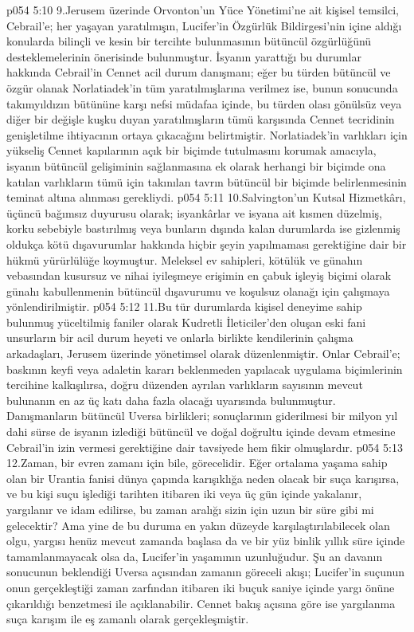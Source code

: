 \vs p054 5:10 9.\bibnobreakspace Jerusem üzerinde Orvonton’un Yüce Yönetimi’ne ait kişisel temsilci, Cebrail’e; her yaşayan yaratılmışın, Lucifer’in Özgürlük Bildirgesi’nin içine aldığı konularda bilinçli ve kesin bir tercihte bulunmasının bütüncül özgürlüğünü desteklemelerinin önerisinde bulunmuştur. İsyanın yarattığı bu durumlar hakkında Cebrail’in Cennet acil durum danışmanı; eğer bu türden bütüncül ve özgür olanak Norlatiadek’in tüm yaratılmışlarına verilmez ise, bunun sonucunda takımyıldızın bütününe karşı nefsi müdafaa içinde, bu türden olası gönülsüz veya diğer bir değişle kuşku duyan yaratılmışların tümü karşısında Cennet tecridinin genişletilme ihtiyacının ortaya çıkacağını belirtmiştir. Norlatiadek’in varlıkları için yükseliş Cennet kapılarının açık bir biçimde tutulmasını korumak amacıyla, isyanın bütüncül gelişiminin sağlanmasına ek olarak herhangi bir biçimde ona katılan varlıkların tümü için takınılan tavrın bütüncül bir biçimde belirlenmesinin teminat altına alınması gerekliydi.
\vs p054 5:11 10.\bibnobreakspace Salvington’un Kutsal Hizmetkârı, üçüncü bağımsız duyurusu olarak; isyankârlar ve isyana ait kısmen düzelmiş, korku sebebiyle bastırılmış veya bunların dışında kalan durumlarda ise gizlenmiş oldukça kötü dışavurumlar hakkında hiçbir şeyin yapılmaması gerektiğine dair bir hükmü yürürlülüğe koymuştur. Meleksel ev sahipleri, kötülük ve günahın vebasından kusursuz ve nihai iyileşmeye erişimin en çabuk işleyiş biçimi olarak günahı kabullenmenin bütüncül dışavurumu ve koşulsuz olanağı için çalışmaya yönlendirilmiştir.
\vs p054 5:12 11.\bibnobreakspace Bu tür durumlarda kişisel deneyime sahip bulunmuş yüceltilmiş faniler olarak Kudretli İleticiler’den oluşan eski fani unsurların bir acil durum heyeti ve onlarla birlikte kendilerinin çalışma arkadaşları, Jerusem üzerinde yönetimsel olarak düzenlenmiştir. Onlar Cebrail’e; baskının keyfi veya adaletin kararı beklenmeden yapılacak uygulama biçimlerinin tercihine kalkışılırsa, doğru düzenden ayrılan varlıkların sayısının mevcut bulunanın en az üç katı daha fazla olacağı uyarısında bulunmuştur. Danışmanların bütüncül Uversa birlikleri; sonuçlarının giderilmesi bir milyon yıl dahi sürse de isyanın izlediği bütüncül ve doğal doğrultu içinde devam etmesine Cebrail’in izin vermesi gerektiğine dair tavsiyede hem fikir olmuşlardır.
\vs p054 5:13 12.\bibnobreakspace Zaman, bir evren zamanı için bile, görecelidir. Eğer ortalama yaşama sahip olan bir Urantia fanisi dünya çapında karışıklığa neden olacak bir suça karışırsa, ve bu kişi suçu işlediği tarihten itibaren iki veya üç gün içinde yakalanır, yargılanır ve idam edilirse, bu zaman aralığı sizin için uzun bir süre gibi mi gelecektir? Ama yine de bu duruma en yakın düzeyde karşılaştırılabilecek olan olgu, yargısı henüz mevcut zamanda başlasa da ve bir yüz binlik yıllık süre içinde tamamlanmayacak olsa da, Lucifer’in yaşamının uzunluğudur. Şu an davanın sonucunun beklendiği Uversa açısından zamanın göreceli akışı; Lucifer’in suçunun onun gerçekleştiği zaman zarfından itibaren iki buçuk saniye içinde yargı önüne çıkarıldığı benzetmesi ile açıklanabilir. Cennet bakış açısına göre ise yargılanma suça karışım ile eş zamanlı olarak gerçekleşmiştir.
